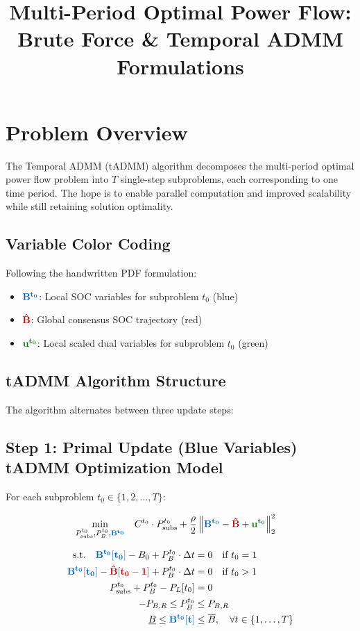 \documentclass[11pt]{article}
\title{Multi-Period Optimal Power Flow:\\Brute Force \& Temporal ADMM Formulations}
\author{}
\date{}
\newcommand{\blueB}[1]{\textcolor{bluevar}{\mathbf{#1}}}      %
\newcommand{\redBhat}[1]{\textcolor{redvar}{\mathbf{#1}}}     %
\newcommand{\greenu}[1]{\textcolor{greenvar}{\mathbf{#1}}}    %
\begin{document}
\maketitle

\section{Problem Overview}

The Temporal ADMM (tADMM) algorithm decomposes the multi-period optimal power flow problem into $T$ single-step subproblems, each corresponding to one time period. The hope is to enable parallel computation and improved scalability while still retaining solution optimality.

\subsection{Variable Color Coding}
Following the handwritten PDF formulation:
\begin{itemize}
    \item $\blueB{B^{t_0}}$: Local SOC variables for subproblem $t_0$ (blue)
    \item $\redBhat{\hat{B}}$: Global consensus SOC trajectory (red)
    \item $\greenu{u^{t_0}}$: Local scaled dual variables for subproblem $t_0$ (green)
\end{itemize}

\subsection{tADMM Algorithm Structure}

The algorithm alternates between three update steps:

\subsection{Step 1: Primal Update (Blue Variables) tADMM Optimization Model}
For each subproblem $t_0 \in \{1, 2, \ldots, T\}$:

\begin{align}
\min_{P_{\text{subs}}^{t_0}, P_{B}^{t_0}, \blueB{B^{t_0}}} \quad & C^{t_0} \cdot P_{\text{subs}}^{t_0} + \frac{\rho}{2} \left\| \blueB{B^{t_0}} - \redBhat{\hat{B}} + \greenu{u^{t_0}} \right\|_2^2
\end{align}

\begin{align}
\text{s.t.} \quad \blueB{B^{t_0}[t_0]} - B_0 + P_{B}^{t_0} \cdot \Delta t &= 0 \quad \text{if } t_0 = 1 \\
\blueB{B^{t_0}[t_0]} - \redBhat{\hat{B}[t_0-1]} + P_{B}^{t_0} \cdot \Delta t &= 0 \quad \text{if } t_0 > 1 \\
P_{\text{subs}}^{t_0} + P_{B}^{t_0} - P_L[t_0] &= 0 \\
-P_{B,R} \leq P_{B}^{t_0} &\leq P_{B,R} \\
\underline{B} \leq \blueB{B^{t_0}[t]} &\leq \overline{B}, \quad \forall t \in \{1, \ldots, T\}
\end{align}
\end{document}
